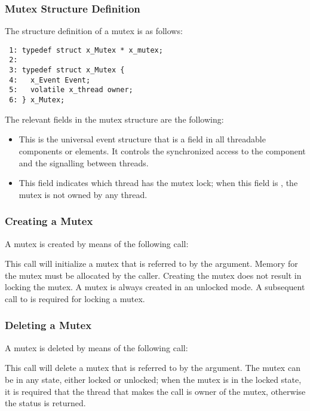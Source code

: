 \subsubsection{Mutex Structure Definition}

The structure definition of a mutex is as follows:

\bcode
\begin{verbatim}
 1: typedef struct x_Mutex * x_mutex;
 2:
 3: typedef struct x_Mutex {
 4:   x_Event Event;
 5:   volatile x_thread owner;
 6: } x_Mutex;
\end{verbatim}
\ecode

The relevant fields in the mutex structure are the following:

\begin{itemize}
\item {} This is the universal event structure that is a field
in all threadable components or elements. It controls the synchronized access
to the component and the signalling between threads.
\item {} This field indicates which
thread has the mutex lock; when this field is , the
mutex is not owned by any thread.
\end{itemize}

\subsubsection{Creating a Mutex}

A mutex is created by means of the following call:


This call will initialize a mutex that is referred to by the 
argument. Memory for the mutex must be allocated by the caller. Creating the
mutex does not result in locking the mutex. A mutex is always created in an
unlocked mode. A subsequent call to  is required for
locking a mutex.

\subsubsection{Deleting a Mutex}

A mutex is deleted by means of the following call:


This call will delete a mutex that is referred to by the  argument.
The mutex can be in any state, either locked or unlocked; when the mutex is
in the locked state, it is required that the thread that makes the call is
owner of the mutex, otherwise the  status is
returned.

